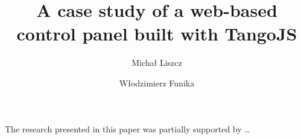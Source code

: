 \documentclass[10pt]{article}
\begin{document}
\begin{opening}

\title{A case study of a web-based control panel built with TangoJS}

\author[liszcz.michal@gmail.com]{Michał Liszcz}

\author[AGH University of Science and Technology, ACC CYFRONET AGH, Kraków, Poland, funika@agh.edu.pl]{Włodzimierz Funika}

\begin{abstract}
    
\end{abstract}


\end{opening}

\tikzset{font=\Large}



\begin{acknowledgements}
 The research presented in this paper was partially supported by \ldots
\end{acknowledgements}




\end{document}
